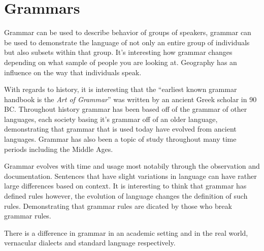 \documentclass{article}
\begin{document}
\section{Grammars}

\medskip

Grammar can be used to describe behavior of groups of speakers, grammar can be used to demonstrate the language of not only an
entire group of individuals but also subsets within that group. It's interesting how grammar changes depending on what sample 
of people you are looking at. Geography has an influence on the way that individuals speak.

\medskip

With regards to history, it is interesting that the ``earliest known grammar handbook is the \textit{Art of Grammar}'' was written
by an ancient Greek scholar in 90 BC. Throughout history grammar has been based off of the grammar of other languages, each society
basing it's grammar off of an older language, demonstrating that grammar that is used today have evolved from ancient languages.
Grammar has also been a topic of study throughout many time periods including the Middle Ages.

\medskip

Grammar evolves with time and usage most notabily through the observation and documentation. Sentences that have slight variations in
language can have rather large differences based on context. It is interesting to think that grammar has defined rules however, the 
evolution of language changes the definition of such rules. Demonstrating that grammar rules are dicated by those who break grammar 
rules. 

\medskip

There is a difference in grammar in an academic setting and in the real world, vernacular dialects and standard language respectively.
\end{document}
